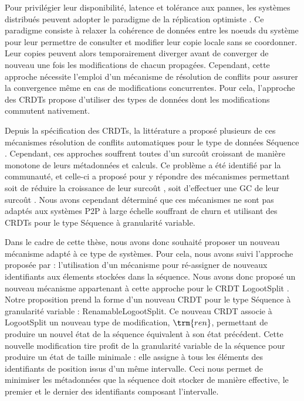 Pour privilégier leur disponibilité, latence et tolérance aux pannes, les systèmes distribués peuvent adopter le paradigme de la réplication optimiste \cite{2005-optimistic-replication-saito}.
Ce paradigme consiste à relaxer la cohérence de données entre les noeuds du système pour leur permettre de consulter et modifier leur copie locale sans se coordonner.
Leur copies peuvent alors temporairement diverger avant de converger de nouveau une fois les modifications de chacun propagées.
Cependant, cette approche nécessite l'emploi d'un mécanisme de résolution de conflits pour assurer la convergence même en cas de modifications concurrentes.
Pour cela, l'approche des \acp{CRDT} \cite{2007-crdt-shapiro,shapiro_2011_crdt} propose d'utiliser des types de données dont les modifications commutent nativement.

Depuis la spécification des \acp{CRDT}, la littérature a proposé plusieurs de ces mécanismes résolution de conflits automatiques pour le type de données Séquence \cite{2006-woot-oster,ROH2011354,2009-treedoc-preguica,2009-logoot-weiss}.
Cependant, ces approches souffrent toutes d'un surcoût croissant de manière monotone de leurs métadonnées et calculs.
Ce problème a été identifié par la communauté, et celle-ci a proposé pour y répondre des mécanismes permettant soit de réduire la croissance de leur surcoût \cite{lseq2013,lseq2017}, soit d'effectuer une \acf{GC} de leur surcoût \cite{ROH2011354,letia:hal-01248270,zawirski:hal-01248197}.
Nous avons cependant déterminé que ces mécanismes ne sont pas adaptés aux systèmes \ac{P2P} à large échelle souffrant de churn et utilisant des \acp{CRDT} pour le type Séquence à granularité variable.

Dans le cadre de cette thèse, nous avons donc souhaité proposer un nouveau mécanisme adapté à ce type de systèmes.
Pour cela, nous avons suivi l'approche proposée par \cite{letia:hal-01248270,zawirski:hal-01248197} : l'utilisation d'un mécanisme pour ré-assigner de nouveaux identifiants aux élements stockées dans la séquence.
Nous avons donc proposé un nouveau mécanisme appartenant à cette approche pour le \ac{CRDT} LogootSplit \cite{2013-logootsplit}.\\

Notre proposition prend la forme d'un nouveau \ac{CRDT} pour le type Séquence à granularité variable : RenamableLogootSplit.
Ce nouveau \ac{CRDT} associe à LogootSplit un nouveau type de modification, $\trm{ren}$, permettant de produire un nouvel état de la séquence équivalent à son état précédent.
Cette nouvelle modification tire profit de la granularité variable de la séquence pour produire un état de taille minimale : elle assigne à tous les éléments des identifiants de position issus d'un même intervalle.
Ceci nous permet de minimiser les métadonnées que la séquence doit stocker de manière effective, \ie le premier et le dernier des identifiants composant l'intervalle.

